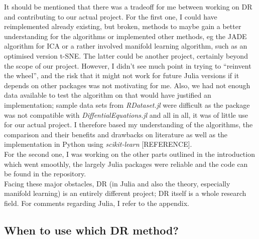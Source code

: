\documentclass[journal, a4paper]{IEEEtran}
\begin{document}
It should be mentioned that there was a tradeoff for me between working on DR and contributing to our actual project. 
For the first one, I could have reimplemented already existing, but broken, methods to maybe gain a better understanding for the algorithms or implemented other methods, eg the JADE algorithm for ICA or a rather involved manifold learning algorithm, such as an optimised version t-SNE. The latter could be another project, certainly beyond the scope of our project. However, I didn’t see much point in trying to “reinvent the wheel”, and the risk that it might not work for future Julia versions if it depends on other packages was not motivating for me. Also, we had not enough data available to test the algorithm on that would have justified an implementation; sample data sets from \textit{RDataset.jl} were difficult as the package was not compatible with \textit{DiffentialEquations.jl} and all in all, it was of little use for our actual project. I therefore based my understanding of the algorithms, the comparison and their benefits and drawbacks on literature as well as the implementation in Python using \textit{scikit-learn} [REFERENCE].\\
For the second one, I was working on the other parts outlined in the introduction which went smoothly, the largely Julia packages were reliable and the code can be found in the repository. \\

Facing these major obstacles, DR (in Julia and also the theory, especially manifold learning) is an entirely different project; DR itself is a whole research field. For comments regarding Julia, I refer to the appendix. \\


\subsection{When to use which DR method?}
\end{document}
